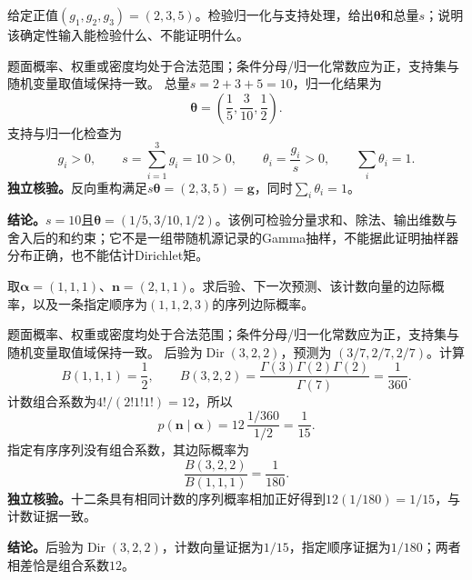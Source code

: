 \begin{example}[Gamma归一化的确定性测试]\label{exm:V5-C05-gamma-interface}
给定正值$(g_1,g_2,g_3)=(2,3,5)$。检验归一化与支持处理，给出$\boldsymbol\theta$和总量$s$；说明该确定性输入能检验什么、不能证明什么。
\end{example}
\begin{solution}
\SolGiven 题面概率、权重或密度均处于合法范围；条件分母/归一化常数应为正，支持集与随机变量取值域保持一致。
\SolDerive
\nopagebreak[4]
总量$s=2+3+5=10$，归一化结果为
\[
\boldsymbol\theta=\left(\frac15,\frac3{10},\frac12\right).
\]
支持与归一化检查为
\[
g_i>0,\qquad s=\sum_{i=1}^3g_i=10>0,\qquad
\theta_i=\frac{g_i}{s}>0,\qquad \sum_i\theta_i=1.
\]
\textbf{独立核验。}反向重构满足$s\boldsymbol\theta=(2,3,5)=\boldsymbol g$，同时$\sum_i\theta_i=1$。

\textbf{结论。}$s=10$且$\boldsymbol\theta=(1/5,3/10,1/2)$。该例可检验分量求和、除法、输出维数与舍入后的和约束；它不是一组带随机源记录的Gamma抽样，不能据此证明抽样器分布正确，也不能估计Dirichlet矩。
\end{solution}

\begin{example}[计数证据与序列证据]\label{exm:V5-C05-evidence}
取$\boldsymbol\alpha=(1,1,1)$、$\boldsymbol n=(2,1,1)$。求后验、下一次预测、该计数向量的边际概率，以及一条指定顺序为$(1,1,2,3)$的序列边际概率。
\end{example}
\begin{solution}
\SolGiven 题面概率、权重或密度均处于合法范围；条件分母/归一化常数应为正，支持集与随机变量取值域保持一致。
\SolDerive
\nopagebreak[4]
后验为$\operatorname{Dir}(3,2,2)$，预测为
$(3/7,2/7,2/7)$。计算
\[
B(1,1,1)=\frac12,\qquad
B(3,2,2)=\frac{\Gamma(3)\Gamma(2)\Gamma(2)}{\Gamma(7)}
=\frac1{360}.
\]
计数组合系数为$4!/(2!1!1!)=12$，所以
\[
p(\boldsymbol n\mid\boldsymbol\alpha)
=12\,\frac{1/360}{1/2}=\frac1{15}.
\]
指定有序序列没有组合系数，其边际概率为
\[
\frac{B(3,2,2)}{B(1,1,1)}=\frac1{180}.
\]
\textbf{独立核验。}十二条具有相同计数的序列概率相加正好得到$12(1/180)=1/15$，与计数证据一致。

\textbf{结论。}后验为$\operatorname{Dir}(3,2,2)$，计数向量证据为$1/15$，指定顺序证据为$1/180$；两者相差恰是组合系数$12$。
\end{solution}

